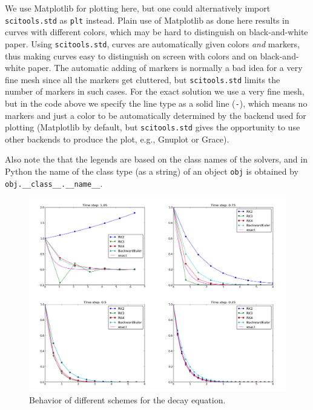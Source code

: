\documentclass[%
oneside,                 %
final,                   %
10pt]{article}
\newenvironment{notice_mdfboxadmon}[1][]{
\begin{notice_mdfboxmdframed}[frametitle=#1]
}
{
\end{notice_mdfboxmdframed}
}
\begin{document}
\begin{notice_mdfboxadmon}
We use Matplotlib for
plotting here, but one could alternatively import \texttt{scitools.std} as \texttt{plt} instead. Plain use of Matplotlib as done here results in
curves with different colors, which may be hard to distinguish on
black-and-white paper. Using \texttt{scitools.std}, curves are
automatically given colors \emph{and} markers, thus making curves easy
to distinguish on screen with colors and on black-and-white paper.
The automatic adding of markers is normally a bad idea for a
very fine mesh since all the markers get cluttered, but \texttt{scitools.std} limits
the number of markers in such cases.
For the exact solution we use a very fine mesh, but in the code
above we specify the line type as a solid line (\texttt{-}), which means
no markers and just a color to be automatically determined by
the backend used for plotting (Matplotlib by default, but
\texttt{scitools.std} gives the opportunity to use other backends
to produce the plot, e.g., Gnuplot or Grace).

Also note the that the legends
are based on the class names of the solvers, and in Python the name of
the class type (as a string) of an object \texttt{obj} is obtained by
\Verb!obj.__class__.__name__!.
\end{notice_mdfboxadmon}




\begin{figure}[!ht]  %
  \centerline{\includegraphics[width=1.1\linewidth]{fig-genz/decay_odespy1_png.png}}
  \caption{
  Behavior of different schemes for the decay equation. \label{decay:odespy:fig1}
  }
\end{figure}
\end{document}
